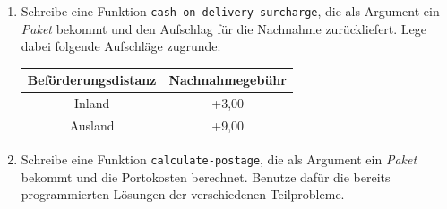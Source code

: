 \begin{aufgabe}
\begin{enumerate}
  \item Schreibe eine Funktion
    \texttt{cash-on-delivery-surcharge}, die als Argument ein
    \textit{Paket} bekommt und den Aufschlag für die Nachnahme
    zurückliefert.  Lege dabei folgende Aufschläge zugrunde:

    \begin{center}
      \begin{tabular}{c|c}
        Beförderungsdistanz & Nachnahmegebühr \\
        \hline
        Inland & +3,00 \\
        Ausland & +9,00 \\
      \end{tabular}
    \end{center}

  \item Schreibe eine Funktion \texttt{calculate-postage}, die
    als Argument ein \textit{Paket} bekommt und die Portokosten
    berechnet.  Benutze dafür die bereits programmierten
    Lösungen der verschiedenen Teilprobleme.
    
  \end{enumerate}
  
\end{aufgabe}

